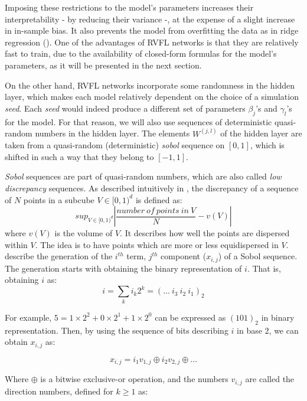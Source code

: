 \medskip

Imposing these restrictions to the model's parameters increases their interpretability - by reducing their variance -, at the expense of a slight increase in in-sample bias. It also prevents the model from overfitting the data as in ridge regression (\cite{hoerl1970ridge}). One of the advantages of RVFL networks is that they are relatively fast to train, due to the availability of closed-form formulas for the model's parameters, as it will be presented in the next section.

\medskip

On the other hand, RVFL networks incorporate some randomness in the hidden layer, which makes each model relatively dependent on the choice of a simulation \textit{seed}. Each \textit{seed} would indeed produce a different set of parameters $\beta_j$'s and $\gamma_l$'s for the model. For that reason, we will also use sequences of deterministic quasi-random numbers in the hidden layer. The elements $W^{(j, l)}$ of the hidden layer are taken from a quasi-random (deterministic) \textit{sobol} sequence on $[0, 1]$, which is shifted in such a way that they belong to $[-1, 1]$.

\medskip

\textit{Sobol} sequences are part of quasi-random numbers, which are also called \textit{low discrepancy} sequences. As described intuitively in \cite{boyle1997quasi}, the discrepancy of a sequence of $N$ points in a subcube $V \in [0, 1)^d$ is defined as:
$$
sup_{V \in [0, 1)^d} |\frac{number \: of \: points \: in \: V}{N} - v(V)|
$$
where $v(V)$ is the volume of $V$. It describes how well the points are dispersed within $V$. The idea is to have points which are more or less equidispersed in $V$. \cite{joe2008sobol} describe the generation of the $i^{th}$ term, $j^{th}$ component ($x_{i, j}$) of a Sobol sequence. The generation starts with obtaining the binary representation of $i$. That is, obtaining $i$ as:
$$
i = \sum_k i_k 2^k = ( \ldots \: i_3 \: i_2 \: i_1)_2
$$

For example, $5 = 1 \times 2^2 + 0 \times 2^1 + 1 \times 2^0$ can be expressed as $(101)_2$ in binary representation. Then, by using the sequence of bits describing $i$ in base $2$, we can obtain $x_{i, j}$ as:

\begin{equation}
\label{ithjthsobol}
x_{i, j} = i_1 v_{1, j} \oplus i_2 v_{2, j} \oplus \ldots
\end{equation}

Where $\oplus$ is a bitwise exclusive-or operation, and the numbers $v_{i, j}$ are called the direction numbers, defined for $k \geq 1$ as:

